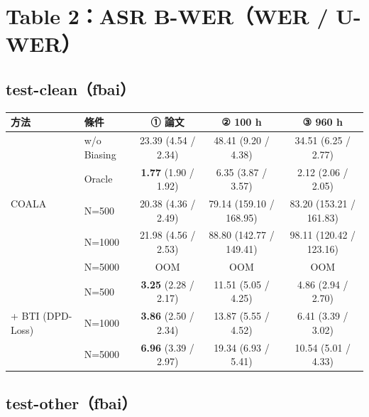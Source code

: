 \documentclass[11pt,a4paper]{article}
\begin{document}
\section*{Table 2：ASR B-WER（WER / U-WER）}

\subsection*{test-clean（fbai）}

\begin{center}
{\small
\begin{tabular}{llccc}
\toprule
\textbf{方法} & \textbf{條件} & \textbf{① 論文} & \textbf{② 100 h} & \textbf{③ 960 h} \\
\midrule
\multirow{5}{*}{COALA}
 & w/o Biasing & 23.39 (4.54 / 2.34) & 48.41 (9.20 / 4.38) & 34.51 (6.25 / 2.77) \\
 & Oracle      & \textbf{1.77} (1.90 / 1.92) & 6.35 (3.87 / 3.57) & 2.12 (2.06 / 2.05) \\
 & N=500       & 20.38 (4.36 / 2.49) & 79.14 (159.10 / 168.95) & 83.20 (153.21 / 161.83) \\
 & N=1000      & 21.98 (4.56 / 2.53) & 88.80 (142.77 / 149.41) & 98.11 (120.42 / 123.16) \\
 & N=5000      & OOM & OOM & OOM \\
\midrule
\multirow{3}{*}{+ BTI (DPD-Loss)}
 & N=500       & \textbf{3.25} (2.28 / 2.17) & 11.51 (5.05 / 4.25) & 4.86 (2.94 / 2.70) \\
 & N=1000      & \textbf{3.86} (2.50 / 2.34) & 13.87 (5.55 / 4.52) & 6.41 (3.39 / 3.02) \\
 & N=5000      & \textbf{6.96} (3.39 / 2.97) & 19.34 (6.93 / 5.41) & 10.54 (5.01 / 4.33) \\
\bottomrule
\end{tabular}
}
\end{center}

\subsection*{test-other（fbai）}
\end{document}
